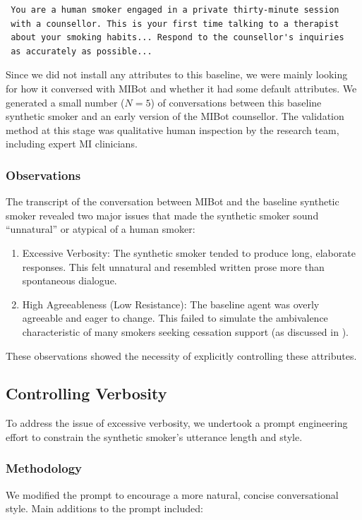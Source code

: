 \begin{verbatim}
 You are a human smoker engaged in a private thirty-minute session
 with a counsellor. This is your first time talking to a therapist
 about your smoking habits... Respond to the counsellor's inquiries
 as accurately as possible...
\end{verbatim}

Since we did not install any attributes to this baseline, we were mainly looking for how it conversed with MIBot and whether it had some default attributes. We generated a small number ($N=5$) of conversations between this baseline synthetic smoker and an early version of the MIBot counsellor. The validation method at this stage was qualitative human inspection by the research team, including expert MI clinicians.

\subsubsection{Observations}
The transcript of the conversation between MIBot and the baseline synthetic smoker revealed two major issues that made the synthetic smoker sound ``unnatural'' or atypical of a human smoker:

\begin{enumerate}
	\item Excessive Verbosity: The synthetic smoker tended to produce long, elaborate responses. This felt unnatural and resembled written prose more than spontaneous dialogue.
	\item High Agreeableness (Low Resistance): The baseline agent was overly agreeable and eager to change. This failed to simulate the ambivalence characteristic of many smokers seeking cessation support (as discussed in ).
\end{enumerate}

These observations showed the necessity of explicitly controlling these attributes.

\subsection{Controlling Verbosity}
\label{sec:synthetic-smoker-verbosity}

To address the issue of excessive verbosity, we undertook a prompt engineering effort to constrain the synthetic smoker's utterance length and style.

\subsubsection{Methodology}
We modified the prompt to encourage a more natural, concise conversational style. Main additions to the prompt included:

